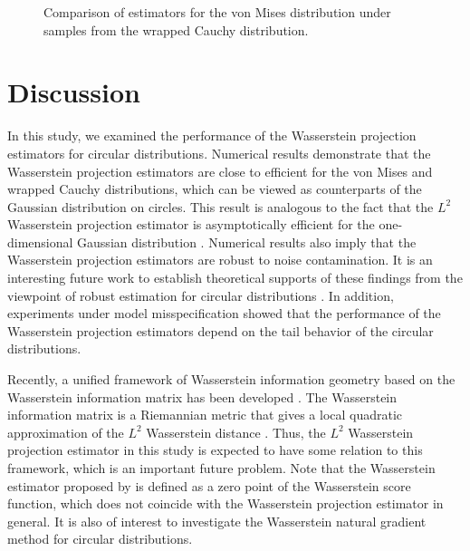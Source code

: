 \documentclass[11pt, a4paper]{article}
\begin{document}
\begin{figure}
	\caption{Comparison of estimators for the von Mises distribution under samples from the wrapped Cauchy distribution.}
	\label{fig_WCvM}
\end{figure}

\section{Discussion}
In this study, we examined the performance of the Wasserstein projection estimators for circular distributions.
Numerical results demonstrate that the Wasserstein projection estimators are close to efficient for the von Mises and wrapped Cauchy distributions, which can be viewed as counterparts of the Gaussian distribution on circles.
This result is analogous to the fact that the $L^2$ Wasserstein projection estimator is asymptotically efficient for the one-dimensional Gaussian distribution \cite{AM2022}.
Numerical results also imply that the Wasserstein projection estimators are robust to noise contamination.
It is an interesting future work to establish theoretical supports of these findings from the viewpoint of robust estimation for circular distributions \cite{Ko,Agostinelli,Kato}.
In addition, experiments under model misspecification showed that the performance of the Wasserstein projection estimators depend on the tail behavior of the circular distributions.

Recently, a unified framework of Wasserstein information geometry based on the Wasserstein information matrix has been developed \cite{WIM,Ay,Nishimori,Fukushi}.
The Wasserstein information matrix is a Riemannian metric that gives a local quadratic approximation of the $L^2$ Wasserstein distance \citep{Ay}. 
Thus, the $L^2$ Wasserstein projection estimator in this study is expected to have some relation to this framework, which is an important future problem.
Note that the Wasserstein estimator proposed by \cite{WIM} is defined as a zero point of the Wasserstein score function, which does not coincide with the Wasserstein projection estimator in general.
It is also of interest to investigate the Wasserstein natural gradient method \citep{Chen} for circular distributions.
\end{document}
